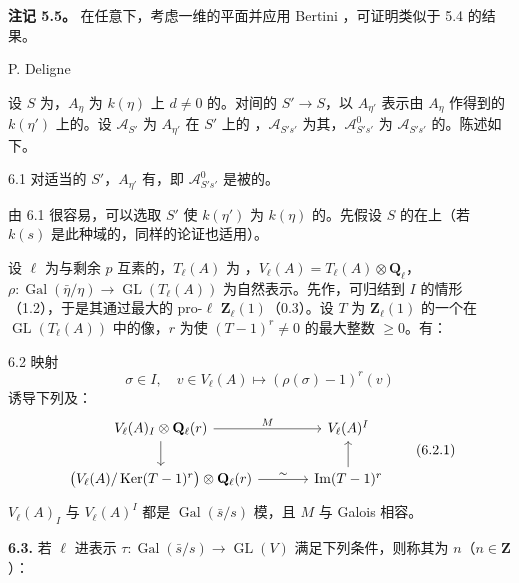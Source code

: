 \textbf{注记 5.5。} 在任意下，考虑一维的平面并应用 Bertini ，可证明类似于 5.4 的结果。

\begin{center}P. Deligne\end{center}
设 $S$ 为，$A_\eta$ 为 $k(\eta)$ 上 $d\ne0$ 的。对间的 $S'\to S$，以 $A_{\eta'}$ 表示由 $A_\eta$ 作得到的 $k(\eta')$ 上的。设 $\mathcal A_{S'}$ 为 $A_{\eta'}$ 在 $S'$ 上的 ，$\mathcal A_{S's'}$ 为其，$\mathcal A^0_{S's'}$ 为 $\mathcal A_{S's'}$ 的。陈述如下。

\begin{SGAresult}{}{6.1}
对适当的 $S'$，$A_{\eta'}$ 有，即 $\mathcal A^0_{S's'}$ 是被的。
\end{SGAresult}
由 6.1 很容易，可以选取 $S'$ 使 $k(\eta')$ 为 $k(\eta)$ 的。先假设 $S$ 的在上（若 $k(s)$ 是此种域的，同样的论证也适用）。

设 $\ell$ 为与剩余 $p$ 互素的，$T_\ell(A)$ 为 ，$V_\ell(A)=T_\ell(A)\otimes\mathbf Q_\ell$，$\rho:\operatorname{Gal}(\bar\eta/\eta)\to\operatorname{GL}(T_\ell(A))$ 为自然表示。先作，可归结到 $I$ 的情形（1.2），于是其通过最大的 pro-$\ell$  $\mathbf Z_\ell(1)$（0.3）。设 $T$ 为 $\mathbf Z_\ell(1)$ 的一个在 $\operatorname{GL}(T_\ell(A))$ 中的像，$r$ 为使 $(T-1)^r\ne0$ 的最大整数 $\ge0$。有：
\begin{SGAresult}{}{6.2}
映射
\[
\sigma\in I,\quad v\in V_\ell(A)\longmapsto(\rho(\sigma)-1)^r(v)
\]
诱导下列及：
\[
\begin{tikzcd}[column sep=large]
V_\ell(A)_I\otimes\mathbf Q_\ell(r)\arrow[r,"M"]\arrow[d]&V_\ell(A)^I\\
\bigl(V_\ell(A)/\operatorname{Ker}(T-1)^r\bigr)\otimes\mathbf Q_\ell(r)\arrow[r,"\sim"]&\operatorname{Im}(T-1)^r\arrow[u]
\end{tikzcd}\tag{6.2.1}
\]
$V_\ell(A)_I$ 与 $V_\ell(A)^I$ 都是 $\operatorname{Gal}(\bar s/s)$ 模，且 $M$ 与 Galois 相容。
\end{SGAresult}
\textbf{6.3.} 若 $\ell$ 进表示 $\tau:\operatorname{Gal}(\bar s/s)\to\operatorname{GL}(V)$ 满足下列条件，则称其为 $n$（$n\in\mathbf Z$）：


